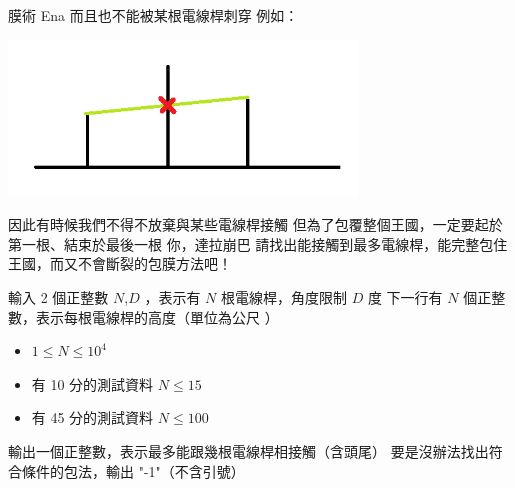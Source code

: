 \begin{problem}{膜術 Ena}
而且也不能被某根電線桿刺穿\newline
例如：\newline

\centerline{\includegraphics[width=25em]{./pics/D-3.png}}

因此有時候我們不得不放棄與某些電線桿接觸\newline
但為了包覆整個王國，一定要起於第一根、結束於最後一根\newline
\newline
\newline
你，達拉崩巴\newline
請找出能接觸到最多電線桿，能完整包住王國，而又不會斷裂的包膜方法吧！\newline


\InputFile

輸入 2 個正整數 $N$,$D$ ，表示有 $N$ 根電線桿，角度限制 $D$ 度 \newline
下一行有 $N$ 個正整數，表示每根電線桿的高度（單位為公尺 ）\newline

\begin{iofmt}
\begin{itemize}
	\item $1 \leq N \leq 10^4$
	\item 有 10 分的測試資料 $N \leq 15$
	\item 有 45 分的測試資料 $N \leq 100$
\end{itemize}
\end{iofmt}

\OutputFile

輸出一個正整數，表示最多能跟幾根電線桿相接觸（含頭尾）\newline
要是沒辦法找出符合條件的包法，輸出 "-1"（不含引號）\newline

\Examples

\begin{example}
\end{example}

\end{problem}
